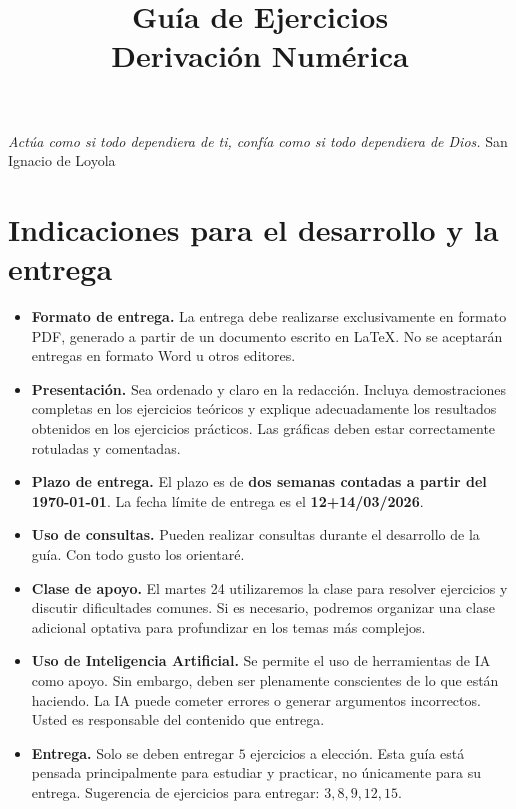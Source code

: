\documentclass[11pt]{article}
\title{Guía de Ejercicios\\Derivación Numérica}
\author{}
\date{}
\begin{document}
\maketitle
\textit{ Actúa como si todo dependiera de ti, confía como si todo dependiera de Dios.}  San Ignacio de Loyola


\section*{Indicaciones para el desarrollo y la entrega}

\begin{itemize}

\item \textbf{Formato de entrega.}  
La entrega debe realizarse exclusivamente en formato PDF,
generado a partir de un documento escrito en \LaTeX.
No se aceptarán entregas en formato Word u otros editores.

\item \textbf{Presentación.}  
Sea ordenado y claro en la redacción.  
Incluya demostraciones completas en los ejercicios teóricos
y explique adecuadamente los resultados obtenidos en los ejercicios prácticos.
Las gráficas deben estar correctamente rotuladas y comentadas.

\item \textbf{Plazo de entrega.}  
El plazo es de \textbf{dos semanas contadas a partir del \today}.  
La fecha límite de entrega es el \textbf{12+14/03/2026}. 

\item \textbf{Uso de consultas.}  
Pueden realizar consultas durante el desarrollo de la guía.
Con todo gusto los orientaré.

\item \textbf{Clase de apoyo.}  
El martes 24 utilizaremos la clase para resolver ejercicios
y discutir dificultades comunes.  
Si es necesario, podremos organizar una clase adicional optativa
para profundizar en los temas más complejos.

\item \textbf{Uso de Inteligencia Artificial.}  
Se permite el uso de herramientas de IA como apoyo.
Sin embargo, deben ser plenamente conscientes de lo que están haciendo.
La IA puede cometer errores o generar argumentos incorrectos.
Usted es responsable del contenido que entrega.


\item {\color{red}\textbf{Entrega.}}  
Solo se deben entregar $5$ ejercicios a elección. Esta guía está pensada principalmente para estudiar y practicar, no únicamente para su entrega. Sugerencia de ejercicios para entregar: $3, 8, 9, 12, 15.$ 

\end{itemize}
\end{document}
